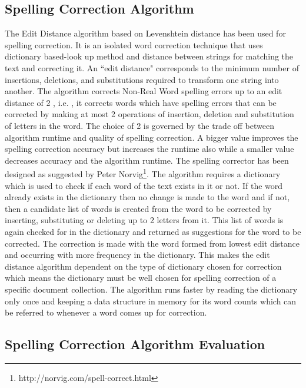 \documentclass[12pt]{article}
\begin{document}
\subsection{Spelling Correction Algorithm}
\label{spell:algo}

The Edit Distance algorithm based on Levenshtein distance\cite{levenshtein1966binary} has been used for spelling correction. It is an isolated word correction technique that uses dictionary based-look up method and distance between strings for matching the text and correcting it. An ``edit distance" corresponds to the minimum number of insertions, deletions, and substitutions required to transform one string into another. The algorithm corrects Non-Real Word spelling errors up to an edit distance of 2 , i.e. , it corrects words which have spelling errors that can be corrected by making at most 2 operations of insertion, deletion and substitution of letters in the word. The choice of 2 is governed by the trade off between algorithm runtime and quality of spelling correction. A bigger value improves the spelling correction accuracy but increases the runtime also while a smaller value decreases accuracy and the algorithm runtime.
The spelling corrector has been designed as suggested by Peter Norvig\footnote{ http://norvig.com/spell-correct.html}. The algorithm requires a dictionary which is used to check if each word of the text exists in it or not. If the word already exists in the dictionary then no change is made to the word and if not, then a candidate list of words is created from the word to be corrected by inserting, substituting or deleting up to 2 letters from it.  This list of words is again checked for in the dictionary and returned as suggestions for the word to be corrected. The correction is made with the word formed from lowest edit distance and occurring with more frequency in the dictionary. This makes the edit distance algorithm dependent on the type of dictionary chosen for correction which means the dictionary must be well chosen for spelling correction of a specific document collection. The algorithm runs faster by reading the dictionary only once and keeping a data structure in memory for its word counts which can be referred to whenever a word comes up for correction.

\subsection{Spelling Correction Algorithm Evaluation}
\end{document}
